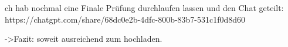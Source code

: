 
ch hab nochmal eine Finale Prüfung durchlaufen lassen und den Chat geteilt: https://chatgpt.com/share/68dc0e2b-4dfc-800b-83b7-531c1f0d8d60

->Fazit: soweit ausreichend zum hochladen.